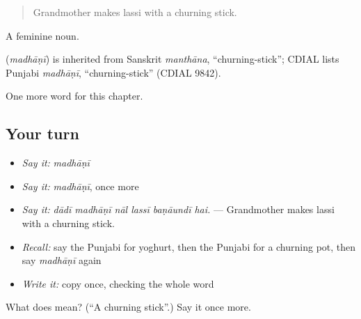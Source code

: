 \begin{quote}
Grandmother makes lassi with a churning stick.
\end{quote}

A feminine noun.

\begin{cousinweb}
\textbf{} (\emph{madhāṇī}) is inherited from Sanskrit \emph{manthāna}, \textquotedblleft{}churning-stick\textquotedblright{}; CDIAL lists Punjabi \emph{madhāṇī}, \textquotedblleft{}churning-stick\textquotedblright{} (CDIAL 9842).
\end{cousinweb}

\begin{grammarlens}[title={What you've built}]
One more word for this chapter.
\end{grammarlens}

\subsection*{Your turn}
\begin{itemize}
\raggedright
  \item \emph{Say it:} \emph{madhāṇī}
  \item \emph{Say it:} \emph{madhāṇī}, once more
  \item \emph{Say it:} \emph{dādī madhāṇī nāl lassī baṇāundī hai.} — Grandmother makes lassi with a churning stick.
  \item \emph{Recall:} say the Punjabi for yoghurt, then the Punjabi for a churning pot, then say \emph{madhāṇī} again
  \item \emph{Write it:} copy \textbf{} once, checking the whole word
\end{itemize}

\begin{tcolorbox}[breakable,colback=teal!4,colframe=teal!35!black,title={Before you move on}]
What does  mean? (\textquotedblleft{}A churning stick\textquotedblright{}.) Say it once more.
\end{tcolorbox}
